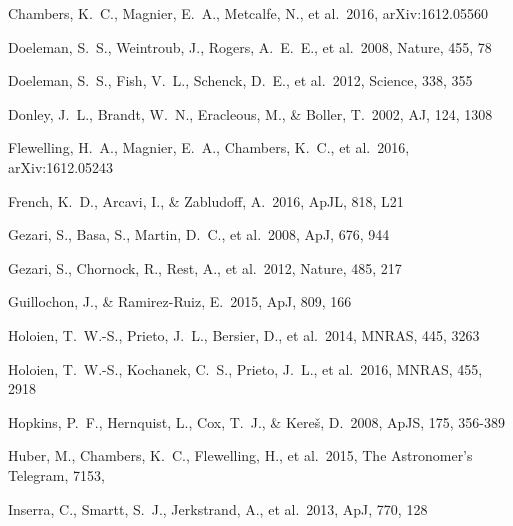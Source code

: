 \documentclass[useAMS,usenatbib]{mn2e}
\def\apj{{ ApJ}}
\def\apjl{{ ApJL}}
\def\apjs{{ ApJS}}
\def\aj{{ AJ}}
\def\mnras{{ MNRAS}}
\def\nat {{ Nature}}
\begin{document}
\begin{thebibliography}{}

 Chambers, K.~C.,
  Magnier, E.~A., Metcalfe, N., et al.\ 2016, arXiv:1612.05560 

 Doeleman, S.~S.,
  Weintroub, J., Rogers, A.~E.~E., et al.\ 2008, \nat, 455, 78 

 Doeleman, S.~S.,
  Fish, V.~L., Schenck, D.~E., et al.\ 2012, Science, 338, 355 

 Donley, J.~L., Brandt, 
W.~N., Eracleous, M., \& Boller, T.\ 2002, \aj, 124, 1308  

 Flewelling,
  H.~A., Magnier, E.~A., Chambers, K.~C., et al.\ 2016,
  arXiv:1612.05243 

 French, K.~D.,
  Arcavi, I., \& Zabludoff, A.\ 2016, \apjl, 818, L21 

 Gezari, S., Basa, S., 
Martin, D.~C., et al.\ 2008, \apj, 676, 944

 Gezari, S., Chornock, 
R., Rest, A., et al.\ 2012, \nat, 485, 217

 Guillochon, J., \& Ramirez-Ruiz, E.\ 2015, \apj, 809, 166


 Holoien, T.~W.-S., 
Prieto, J.~L., Bersier, D., et al.\ 2014, \mnras, 445, 3263 

 Holoien, T.~W.-S., 
Kochanek, C.~S., Prieto, J.~L., et al.\ 2016, \mnras, 455, 2918

 Hopkins, P.~F.,
  Hernquist, L., Cox, T.~J., \& Kere{\v s}, D.\ 2008, \apjs, 175,
  356-389 

 Huber, M., Chambers, K.~C., Flewelling, H., et al.\ 2015, The Astronomer's Telegram, 7153,

 Inserra, C.,
  Smartt, S.~J., Jerkstrand, A., et al.\ 2013, \apj, 770, 128 


\end{thebibliography}
\end{document}
